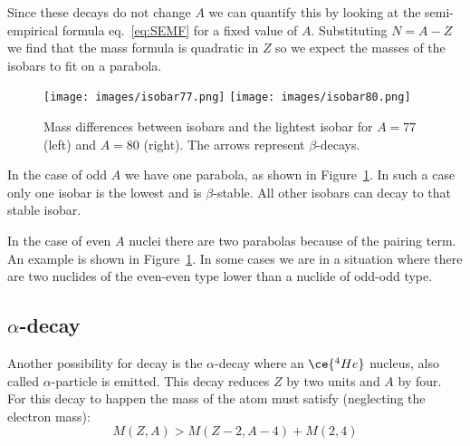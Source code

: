 \documentclass[12pt]{article}
\begin{document}
Since these decays do not change $A$ we can quantify this by looking at the semi-empirical formula eq.~\ref{eq:SEMF} for a fixed value of $A$. Substituting $N=A-Z$ we find that the mass formula is quadratic in $Z$ so we expect the masses of the isobars to fit on a parabola. 
\begin{figure}
\begin{center}
\texttt{[image: images/isobar77.png]}
\texttt{[image: images/isobar80.png]}
\end{center}
\caption{Mass differences between isobars and the lightest isobar for $A=77$ (left) and $A=80$ (right). The arrows represent $\beta$-decays.}\label{fig:isobars}
\end{figure}
In the case of odd $A$ we have one parabola, as shown in Figure~\ref{fig:isobars}. In such a case only one isobar is the lowest and is $\beta$-stable. All other isobars can decay to that stable isobar. 

In the case of even $A$ nuclei there are two parabolas because of the pairing term. An example is shown in Figure~\ref{fig:isobars}. In some cases we are in a situation where there are two nuclides of the even-even type lower than a nuclide of odd-odd type. 

%
%
%
\subsection{$\alpha$-decay}
%
%
%
Another possibility for decay is the $\alpha$-decay where an $\ce{^4He}$ nucleus, also called $\alpha$-particle is emitted. This decay reduces $Z$ by two units and $A$ by four. For this decay to happen the mass of the atom must satisfy (neglecting the electron mass):
\[M(Z,A)> M(Z-2,A-4)+M(2,4)\]
\end{document}
